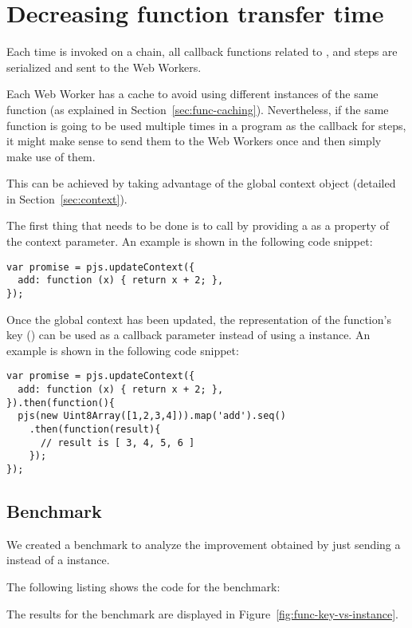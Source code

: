 \section{Decreasing function transfer time}\label{sec:function-transfer-time}

Each time  is invoked on a chain, all callback functions related to ,  and  steps are serialized and sent to the Web Workers.

Each Web Worker has a cache to avoid using different instances of the same function (as explained in Section~\ref{sec:func-caching}). Nevertheless, if the same function is going to be used multiple times in a program as the callback for steps, it might make sense to send them to the Web Workers once and then simply make use of them.

This can be achieved by taking advantage of the global context object (detailed in Section~\ref{sec:context}).

The first thing that needs to be done is to call  by providing a \tfunction{} as a property of the context parameter. An example is shown in the following code snippet:
\begin{lstlisting}[caption=Sending function in global context]
var promise = pjs.updateContext({
  add: function (x) { return x + 2; },
});
\end{lstlisting}

Once the global context has been updated, the \tstring{} representation of the function's key () can be used as a callback parameter instead of using a \tfunction{} instance. An example is shown in the following code snippet:
\begin{lstlisting}[caption=Passing a function name from the global context instead of a funciton as a callback]
var promise = pjs.updateContext({
  add: function (x) { return x + 2; },
}).then(function(){
  pjs(new Uint8Array([1,2,3,4])).map('add').seq()
    .then(function(result){
      // result is [ 3, 4, 5, 6 ]
    });
});
\end{lstlisting}

\subsection{Benchmark}
We created a benchmark to analyze the improvement obtained by just sending a \tstring{} instead of a \tfunction{} instance.

The following listing shows the code for the benchmark:

The results for the benchmark are displayed in Figure~\ref{fig:func-key-vs-instance}.


\pagebreak